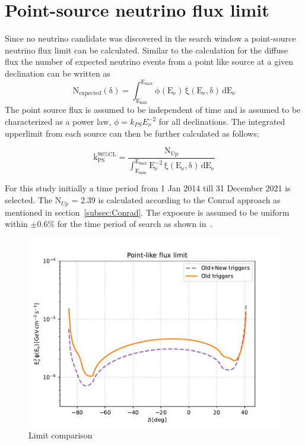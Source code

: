\section{Point-source neutrino flux limit}
\label{sec:pfux_limit}
Since no neutrino candidate was discovered in the search window a point-source neutrino flux limit can be calculated. Similar to the calculation for the diffuse flux the number of expected neutrino events from a point like source at a given declination can be written as 
\begin{equation}
  \mathrm{N_{expected}(\delta) = \int_{E_{min}}^{E_{max}}  \phi(E_{\nu}) \, \xi(E_{\nu}, \delta) \, dE_{\nu}}
\end{equation}
The point source flux is assumed to be independent of time and is assumed to be characterized as a power law, $\phi = k_{PS} E_{\nu}^{-2}$ for all declinations. The integrated upperlimit from each source can then be further calculated as follows:

\begin{equation}
  \label{eq:point_flux_limit}
  \mathrm{k_{PS}^{90\%CL} = \frac{N_{Up}}{\int_{E_{min}}^{E_{max}} E_{\nu}^{-2} \, \xi(E_{\nu}, \delta) \, dE_{\nu}}}
\end{equation}

For this study initially a time period from 1 Jan 2014 till 31 December 2021 is selected. The N$_{Up}$ = 2.39 is calculated according to the Conrad approach as mentioned in section~\ref{subsec:Conrad}. The exposure is assumed to be uniform within $\pm 0.6\%$ for the time period of search as shown in~\cite{PierreAuger:2017pzq}. 


\begin{figure}[t!]
  \centering
  \includegraphics[width=14.5cm]{thesis_figures/PointLimits/Point_comp_new_old.pdf}
  \caption{Limit comparison}
  \label{fig:Dec_limit_new old}
\end{figure}

